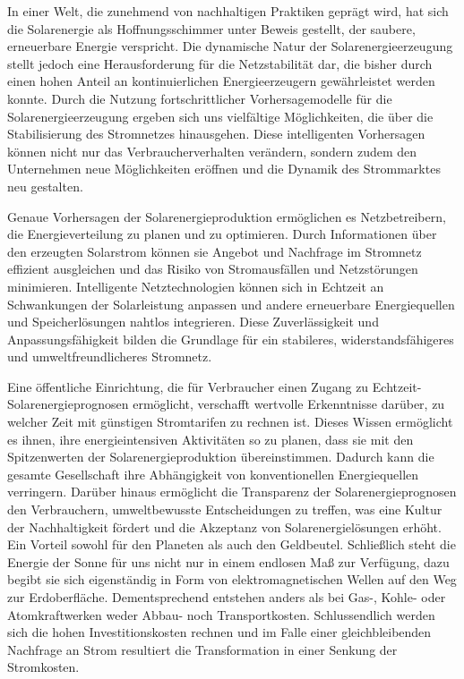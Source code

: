 \documentclass[12pt, a4paper]{article}
\begin{document}
In einer Welt, die zunehmend von nachhaltigen Praktiken geprägt wird, hat sich die Solarenergie als Hoffnungsschimmer unter Beweis gestellt, der saubere, erneuerbare Energie verspricht. Die dynamische Natur der Solarenergieerzeugung stellt jedoch eine Herausforderung für die Netzstabilität dar, die bisher durch einen hohen Anteil an kontinuierlichen Energieerzeugern gewährleistet werden konnte. Durch die Nutzung fortschrittlicher Vorhersagemodelle für die Solarenergieerzeugung ergeben sich uns vielfältige Möglichkeiten, die über die Stabilisierung des Stromnetzes hinausgehen. Diese intelligenten Vorhersagen können nicht nur das Verbraucherverhalten verändern, sondern zudem den Unternehmen neue Möglichkeiten eröffnen und die Dynamik des Strommarktes neu gestalten.

Genaue Vorhersagen der Solarenergieproduktion ermöglichen es Netzbetreibern, die Energieverteilung zu planen und zu optimieren. Durch Informationen über den erzeugten Solarstrom können sie Angebot und Nachfrage im Stromnetz effizient ausgleichen und das Risiko von Stromausfällen und Netzstörungen minimieren. Intelligente Netztechnologien können sich in Echtzeit an Schwankungen der Solarleistung anpassen und andere erneuerbare Energiequellen und Speicherlösungen nahtlos integrieren. Diese Zuverlässigkeit und Anpassungsfähigkeit bilden die Grundlage für ein stabileres, widerstandsfähigeres und umweltfreundlicheres Stromnetz.

Eine öffentliche Einrichtung, die für Verbraucher einen Zugang zu Echtzeit-Solarenergieprognosen ermöglicht, verschafft wertvolle Erkenntnisse darüber, zu welcher Zeit mit günstigen Stromtarifen zu rechnen ist. Dieses Wissen ermöglicht es ihnen, ihre energieintensiven Aktivitäten so zu planen, dass sie mit den Spitzenwerten der Solarenergieproduktion übereinstimmen. Dadurch kann die gesamte Gesellschaft ihre Abhängigkeit von konventionellen Energiequellen verringern. Darüber hinaus ermöglicht die Transparenz der Solarenergieprognosen den Verbrauchern, umweltbewusste Entscheidungen zu treffen, was eine Kultur der Nachhaltigkeit fördert und die Akzeptanz von Solarenergielösungen erhöht. Ein Vorteil sowohl für den Planeten als auch den Geldbeutel. Schließlich steht die Energie der Sonne für uns nicht nur in einem endlosen Maß zur Verfügung, dazu begibt sie sich eigenständig in Form von elektromagnetischen Wellen auf den Weg zur Erdoberfläche. Dementsprechend entstehen anders als bei Gas-, Kohle- oder Atomkraftwerken weder Abbau- noch Transportkosten. Schlussendlich werden sich die hohen Investitionskosten rechnen und im Falle einer gleichbleibenden Nachfrage an Strom resultiert die Transformation in einer Senkung der Stromkosten.
\end{document}
